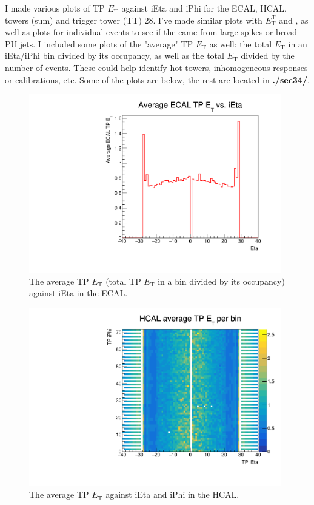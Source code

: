 I made various plots of TP $E_{\mathrm{T}}$ against iEta and iPhi for the ECAL, HCAL, towers (sum) and trigger tower (TT) 28. I've made similar plots with $E_{\mathrm{T}}^{\mathrm{T}}$ and \etmiss, as well as plots for individual events to see if the \etmiss came from large spikes or broad PU jets. I included some plots of the "average" TP $E_{\mathrm{T}}$ as well: the total $E_{\mathrm{T}}$ in an iEta/iPhi bin divided by its occupancy, as well as the total $E_{\mathrm{T}}$ divided by the number of events. These could help identify hot towers, inhomogeneous responses or calibrations, etc. Some of the plots are below, the rest are located in \textbf{./sec34/}.

\begin{figure}[htbp]
\centering
\includegraphics[width=110mm]{./sec34/MET_studies_v6/Plots/ECAL/ECALTPETEta.pdf}
\caption{The average TP $E_{\mathrm{T}}$ (total TP $E_{\mathrm{T}}$ in a bin divided by its occupancy) against iEta in the ECAL.}
\end{figure}

\begin{figure}[htbp]
\centering
\includegraphics[width=110mm]{./sec34/MET_studies_v6/Plots/HCAL/HCALavgTPETEtaPhi.pdf}
\caption{The average TP $E_{\mathrm{T}}$ against iEta and iPhi in the HCAL.}
\end{figure}

